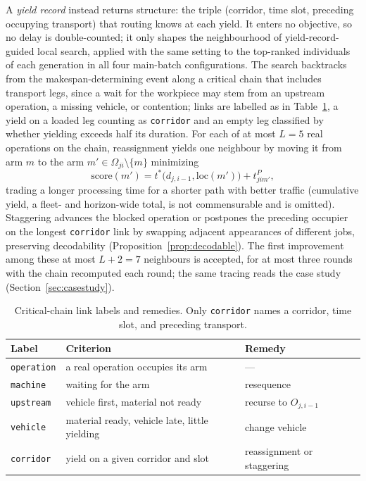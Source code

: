 \documentclass[manuscript,screen,review]{acmart}
\begin{document}
A \emph{yield record} instead returns structure: the triple (corridor, time slot, preceding occupying transport) that routing knows at each yield.
It enters no objective, so no delay is double-counted; it only shapes the neighbourhood of yield-record-guided local search, applied with the same setting to the top-ranked individuals of each generation in all four main-batch configurations.
The search backtracks from the makespan-determining event along a critical chain that includes transport legs, since a wait for the workpiece may stem from an upstream operation, a missing vehicle, or contention; links are labelled as in Table~\ref{tab:attrib}, a yield on a loaded leg counting as \texttt{corridor} and an empty leg classified by whether yielding exceeds half its duration.
For each of at most $L=5$ real operations on the chain, reassignment yields one neighbour by moving it from arm $m$ to the arm $m'\in\Omega_{ji}\setminus\{m\}$ minimizing
\begin{equation}
\label{eq:reassign}
\mathrm{score}(m')=t^{*}\bigl(d_{j,i-1},\mathrm{loc}(m')\bigr)+t^{P}_{jim'},
\end{equation}
trading a longer processing time for a shorter path with better traffic (cumulative yield, a fleet- and horizon-wide total, is not commensurable and is omitted).
Staggering advances the blocked operation or postpones the preceding occupier on the longest \texttt{corridor} link by swapping adjacent appearances of different jobs, preserving decodability (Proposition~\ref{prop:decodable}).
The first improvement among these at most $L+2=7$ neighbours is accepted, for at most three rounds with the chain recomputed each round; the same tracing reads the case study (Section~\ref{sec:casestudy}).

\begin{table}[t]
\caption{Critical-chain link labels and remedies. Only \texttt{corridor} names a corridor, time slot, and preceding transport.}
\label{tab:attrib}
\footnotesize
\begin{tabular}{@{}llp{2.3cm}@{}}
\toprule
Label & Criterion & Remedy \\
\midrule
\texttt{operation} & a real operation occupies its arm & --- \\
\texttt{machine} & waiting for the arm & resequence \\
\texttt{upstream} & vehicle first, material not ready & recurse to $O_{j,i-1}$ \\
\texttt{vehicle} & material ready, vehicle late, little yielding & change vehicle \\
\texttt{corridor} & yield on a given corridor and slot & reassignment or staggering \\
\bottomrule
\end{tabular}
\end{table}
\end{document}
